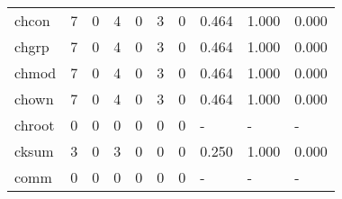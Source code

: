 \begin{longtable}{lp{2.0cm}p{2.0cm}p{2.0cm}p{2.0cm}p{2.0cm}p{2.0cm}p{2.0cm}p{2.0cm}p{2.0cm}}
chcon     &                      7 &                                  0 &                                 4 &                                0 &                                 3 &                               0 &                                0.464 &                                  1.000 &                                0.000 \\
chgrp     &                      7 &                                  0 &                                 4 &                                0 &                                 3 &                               0 &                                0.464 &                                  1.000 &                                0.000 \\
chmod     &                      7 &                                  0 &                                 4 &                                0 &                                 3 &                               0 &                                0.464 &                                  1.000 &                                0.000 \\
chown     &                      7 &                                  0 &                                 4 &                                0 &                                 3 &                               0 &                                0.464 &                                  1.000 &                                0.000 \\
chroot    &                      0 &                                  0 &                                 0 &                                0 &                                 0 &                               0 &                                    - &                                      - &                                    - \\
cksum     &                      3 &                                  0 &                                 3 &                                0 &                                 0 &                               0 &                                0.250 &                                  1.000 &                                0.000 \\
comm      &                      0 &                                  0 &                                 0 &                                0 &                                 0 &                               0 &                                    - &                                      - &                                    - \\

\end{longtable}
